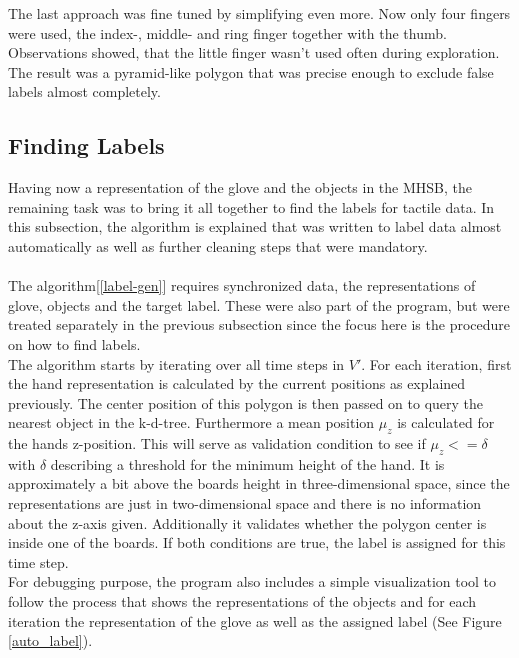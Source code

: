 The last approach was fine tuned by simplifying even more. Now only four fingers were used, the index-, middle- and ring finger together with the thumb. Observations showed, that the little finger wasn't used often during exploration. The result was a pyramid-like polygon that was precise enough to exclude false labels almost completely.       
 
\subsection{Finding Labels}
Having now a representation of the glove and the objects in the MHSB, the remaining task was to bring it all together to find the labels for tactile data. In this subsection, the algorithm is explained that was written to label data almost automatically as well as further cleaning steps that were mandatory.\\
\\
The algorithm[\ref{label-gen}] requires synchronized data, the representations of glove, objects and the target label. These were also part of the program, but were treated separately in the previous subsection since the focus here is the procedure on how to find labels. \\
The algorithm starts by iterating over all time steps in $ V' $. For each iteration, first the hand representation is calculated by the current positions as explained previously. The center position of this polygon is then passed on to query the nearest object in the k-d-tree. Furthermore a mean position $ \mu_{z} $ is calculated for the hands z-position. This will serve as validation condition to see if $ \mu_{z} <= \delta $ with $ \delta $ describing a threshold for the minimum height of the hand. It is approximately a bit above the boards height in three-dimensional space, since the representations are just in two-dimensional space and there is no information about the z-axis given. Additionally it validates whether the polygon center is inside one of the boards. If both conditions are true, the label is assigned for this time step.\\
For debugging purpose, the program also includes a simple visualization tool to follow the process that shows the representations of the objects and for each iteration the representation of the glove as well as the assigned label (See Figure \ref{auto_label}). \\

